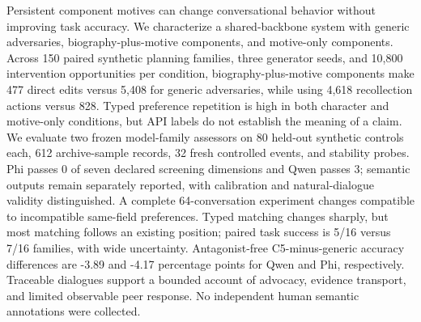 Persistent component motives can change conversational behavior without improving task accuracy. We characterize a shared-backbone system with generic adversaries, biography-plus-motive components, and motive-only components. Across 150 paired synthetic planning families, three generator seeds, and 10,800 intervention opportunities per condition, biography-plus-motive components make 477 direct edits versus 5,408 for generic adversaries, while using 4,618 recollection actions versus 828. Typed preference repetition is high in both character and motive-only conditions, but API labels do not establish the meaning of a claim. We evaluate two frozen model-family assessors on 80 held-out synthetic controls each, 612 archive-sample records, 32 fresh controlled events, and stability probes. Phi passes 0 of seven declared screening dimensions and Qwen passes 3; semantic outputs remain separately reported, with calibration and natural-dialogue validity distinguished. A complete 64-conversation experiment changes compatible to incompatible same-field preferences. Typed matching changes sharply, but most matching follows an existing position; paired task success is 5/16 versus 7/16 families, with wide uncertainty. Antagonist-free C5-minus-generic accuracy differences are -3.89 and -4.17 percentage points for Qwen and Phi, respectively. Traceable dialogues support a bounded account of advocacy, evidence transport, and limited observable peer response. No independent human semantic annotations were collected.
